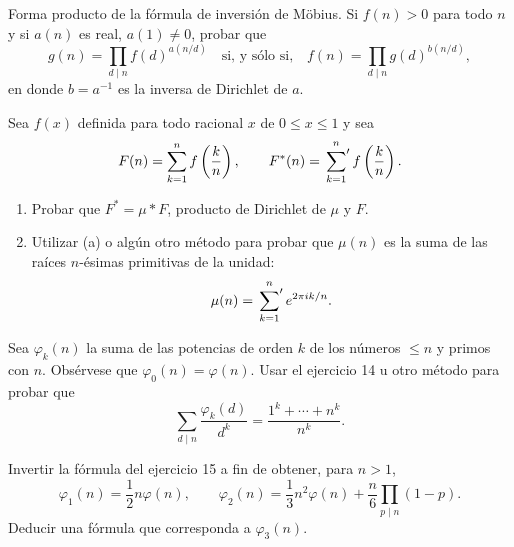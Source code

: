 \documentclass[12pt,a4paper]{book}
\begin{document}
    \begin{ejercicio}
        Forma producto de la fórmula de inversión de Möbius. Si $f(n)>0$ para todo $n$ y
        si $a(n)$ es real, $a(1)\neq0$, probar que
        \begin{equation*}
            g(n)=\prod_{d\mid n}f(d)^{a(n/d)}\quad\text{si, y sólo si,}\quad
            f(n)=\prod_{d\mid n}g(d)^{b(n/d)},
        \end{equation*}
        en donde $b=a^{-1}$ es la inversa de Dirichlet de $a$.
    \end{ejercicio}

    \begin{ejercicio}
        Sea $f(x)$ definida para todo racional $x$ de $0\leq x\leq1$ y sea
        \begin{equation*}
            F(n)=\sum_{k=1}^{n}f\left(\frac{k}{n}\right),\qquad
            F^{*}(n)=\sideset{}{'}\sum_{k=1}^{n}f\left(\frac{k}{n}\right).
        \end{equation*}
        \begin{enumerate}
            \item[(a)] Probar que $F^{*}=\mu*F$, producto de Dirichlet de $\mu$ y $F$.
            \item[(b)] Utilizar (a) o algún otro método para probar que $\mu(n)$ es la suma
            de las raíces $n$-ésimas primitivas de la unidad:
            \begin{equation*}
                \mu(n)=\sideset{}{'}\sum_{k=1}^{n}e^{2\pi ik/n}.
            \end{equation*}
        \end{enumerate}
    \end{ejercicio}

    \begin{ejercicio}
        Sea $\varphi_{k}(n)$ la suma de las potencias de orden $k$ de los números $\leq n$ y
        primos con $n$. Obsérvese que $\varphi_{0}(n)=\varphi(n)$. Usar el ejercicio 14 u
        otro método para probar que
        \begin{equation*}
            \sum_{d\mid n}\frac{\varphi_{k}(d)}{d^{k}}=\frac{1^{k}+\cdots+n^{k}}{n^{k}}.
        \end{equation*}
    \end{ejercicio}

    \begin{ejercicio}
        Invertir la fórmula del ejercicio 15 a fin de obtener, para $n>1$,
        \begin{equation*}
            \varphi_{1}(n)=\frac{1}{2}n\varphi(n),\qquad
            \varphi_{2}(n)=\frac{1}{3}n^{2}\varphi(n)+\frac{n}{6}\prod_{p\mid n}(1-p).
        \end{equation*}
        Deducir una fórmula que corresponda a $\varphi_{3}(n)$.
    \end{ejercicio}
\end{document}
